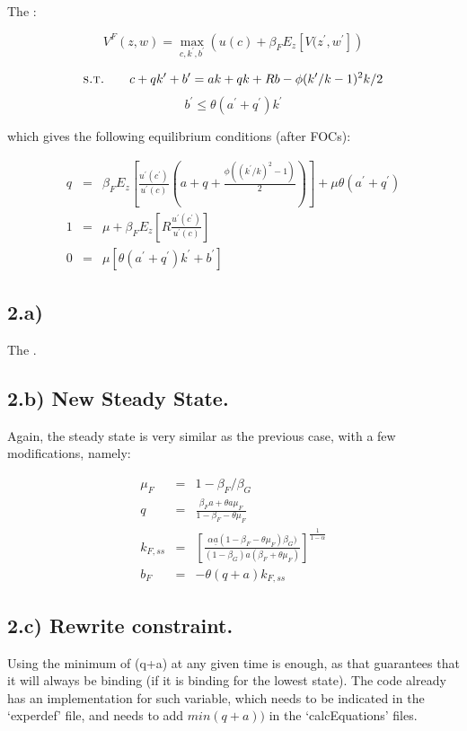 \documentclass{article}
\begin{document}
The :

$$ V^F(z,w) = \max_{c,k^{\prime},b^{\prime} } \left( u(c) + \beta_F E_z \left[ V(z^{\prime},w^{\prime} \right]  \right) $$

$$ \textsc{s.t.} \quad \quad c+qk^\prime+b^\prime = ak + qk +Rb - \phi(k^\prime/k - 1)^2k/2$$
$$b^\prime \leq \theta \left( a^\prime + q^\prime \right)k^\prime $$

which gives the following equilibrium conditions (after FOCs):

\begin{eqnarray*}
 q & = & \beta_F E_z\left[ \frac{u^\prime(c^\prime)}{u^\prime(c)}(a+q+\frac{\phi((k^\prime/k)^2 -1)}{2})\right]+\mu \theta (a^\prime + q^\prime)\\
 1 & = & \mu + \beta_F E_z\left[R\frac{u^\prime(c^\prime)}{u^\prime(c)}\right] \\
 0 & = & \mu \left[\theta (a^\prime + q^\prime) k^\prime + b^\prime\right] 
\end{eqnarray*}


\subsection*{2.a)}

The .



\subsection*{2.b) New Steady State.}

Again, the steady state is very similar as the previous case, with a few modifications, namely:

\begin{eqnarray*}
  \mu_F & = & 1-\beta_F/\beta_G  \\
  q & = & \frac{\beta_F a + \theta a\mu_F}{1-\beta_F - \theta\mu_F}   \\
  k_{F,ss} & = & \left[ \frac{\alpha \underline{a}(1-\beta_F - \theta\mu_F)\beta_G)}{(1-\beta_G) a (\beta_F + \theta \mu_F)} \right]^{\frac{1}{1-\alpha}}  \\
  b_F & = & -\theta(q + a) k_{F,ss}
\end{eqnarray*}


\subsection*{2.c) Rewrite constraint.}

Using the minimum of (q+a) at any given time is enough, as that guarantees that it will always be binding (if it is binding for the lowest state). The code already has an implementation for such variable, which needs to be indicated in the `experdef' file, and needs to add $min(q+a))$ in the `calcEquations' files.
\end{document}
